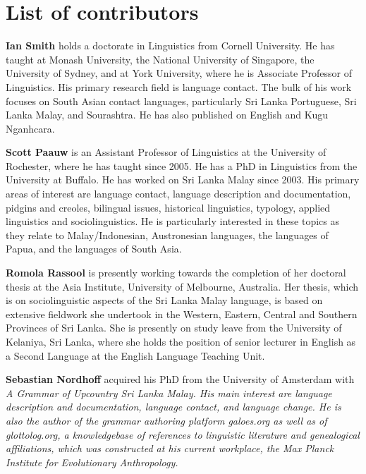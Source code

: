 \section*{List of contributors}
\textbf{Ian Smith} holds a doctorate in Linguistics from Cornell University. He has taught at Monash University, the National University of Singapore, the University of Sydney, and at York University, where he is Associate Professor of Linguistics. His primary research field is language contact. The bulk of his work focuses on South Asian contact languages, particularly Sri Lanka Portuguese, Sri Lanka Malay, and Sourashtra. He has also published on English and Kugu Nganhcara. 

\textbf{Scott Paauw} is an Assistant Professor of Linguistics at the University of Rochester, where he has taught since 2005. He has a PhD in Linguistics from the University at Buffalo. He has worked on Sri Lanka Malay since 2003. His primary areas of interest are language contact, language description and documentation, pidgins and creoles, bilingual issues, historical linguistics, typology, applied linguistics and sociolinguistics. He is particularly interested in these topics as they relate to Malay/Indonesian, Austronesian languages, the languages of Papua, and the languages of South Asia. 

\textbf{Romola Rassool} is presently working towards the completion of her doctoral thesis at the Asia Institute, University of Melbourne, Australia. Her thesis, which is on sociolinguistic aspects of the Sri Lanka Malay language, is based on extensive fieldwork she undertook in the Western, Eastern, Central and Southern Provinces of Sri Lanka. She is presently on study leave from the University of Kelaniya, Sri Lanka, where she holds the position of senior lecturer in English as a Second Language at the English Language Teaching Unit.

\textbf{Sebastian Nordhoff} acquired his PhD from the University of Amsterdam with \em A Grammar of Upcountry Sri Lanka Malay\em. His main interest are language description and documentation, language contact, and language change. He is also the author of the grammar authoring platform galoes.org as well as of glottolog.org, a knowledgebase of references to linguistic literature and genealogical affiliations, which was constructed at his current workplace, the Max Planck Institute for Evolutionary Anthropology.

